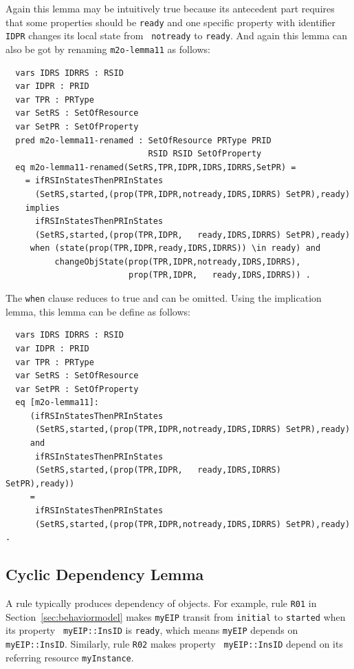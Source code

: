 \documentclass[12pt]{report}
\begin{document}
\normalsize
Again this lemma may be intuitively true because its antecedent part
requires that some properties should be {\tt ready} and one specific
property with identifier {\tt IDPR} changes its local state from {\tt
  notready} to {\tt ready}. And again this lemma can also be got by
renaming {\tt m2o-lemma11} as follows:
\small
\begin{verbatim}
  vars IDRS IDRRS : RSID 
  var IDPR : PRID
  var TPR : PRType
  var SetRS : SetOfResource
  var SetPR : SetOfProperty
  pred m2o-lemma11-renamed : SetOfResource PRType PRID 
                             RSID RSID SetOfProperty
  eq m2o-lemma11-renamed(SetRS,TPR,IDPR,IDRS,IDRRS,SetPR) =
    = ifRSInStatesThenPRInStates
      (SetRS,started,(prop(TPR,IDPR,notready,IDRS,IDRRS) SetPR),ready)
    implies
      ifRSInStatesThenPRInStates
      (SetRS,started,(prop(TPR,IDPR,   ready,IDRS,IDRRS) SetPR),ready)
     when (state(prop(TPR,IDPR,ready,IDRS,IDRRS)) \in ready) and 
          changeObjState(prop(TPR,IDPR,notready,IDRS,IDRRS),
                         prop(TPR,IDPR,   ready,IDRS,IDRRS)) .
\end{verbatim}
\normalsize
The {\tt when} clause reduces to true and can be omitted. Using the
implication lemma, this lemma can be define as follows:
\small
\begin{verbatim}
  vars IDRS IDRRS : RSID 
  var IDPR : PRID
  var TPR : PRType
  var SetRS : SetOfResource
  var SetPR : SetOfProperty
  eq [m2o-lemma11]:
     (ifRSInStatesThenPRInStates
      (SetRS,started,(prop(TPR,IDPR,notready,IDRS,IDRRS) SetPR),ready)
     and
      ifRSInStatesThenPRInStates
      (SetRS,started,(prop(TPR,IDPR,   ready,IDRS,IDRRS) SetPR),ready))
     = 
      ifRSInStatesThenPRInStates
      (SetRS,started,(prop(TPR,IDPR,notready,IDRS,IDRRS) SetPR),ready) .
\end{verbatim}
\normalsize

\subsection{Cyclic Dependency Lemma}
\label{sec:cyclelemma}
A rule typically produces dependency of objects.  For example, rule
{\tt R01} in Section~\ref{sec:behaviormodel} makes {\tt myEIP} transit
from {\tt initial} to {\tt started} when its property {\tt
  myEIP::InsID} is {\tt ready}, which means {\tt myEIP} depends on
{\tt myEIP::InsID}.  Similarly, rule {\tt R02} makes property {\tt
  myEIP::InsID} depend on its referring resource {\tt myInstance}.
\end{document}
